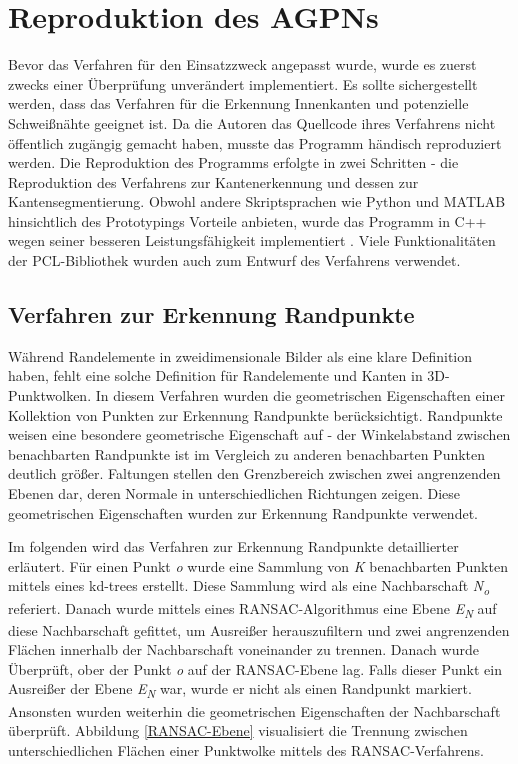 \section{Reproduktion des AGPNs}
Bevor das Verfahren für den Einsatzzweck angepasst wurde, wurde es zuerst zwecks einer Überprüfung unverändert implementiert. Es sollte sichergestellt werden, dass das Verfahren für die Erkennung Innenkanten und potenzielle Schweißnähte geeignet ist. Da die Autoren das Quellcode ihres Verfahrens nicht öffentlich zugängig gemacht haben, musste das Programm händisch reproduziert werden. Die Reproduktion des Programms erfolgte in zwei Schritten - die Reproduktion des Verfahrens zur Kantenerkennung und dessen zur Kantensegmentierung. Obwohl andere Skriptsprachen wie Python und MATLAB hinsichtlich des Prototypings Vorteile anbieten, wurde das Programm in C++ wegen seiner besseren Leistungsfähigkeit implementiert \autocite{svensson_performance_2021}. Viele Funktionalitäten der PCL-Bibliothek \autocite{rusu_3d_2011} wurden auch zum Entwurf des Verfahrens verwendet.

\subsection{Verfahren zur Erkennung Randpunkte}
Während Randelemente in zweidimensionale Bilder als eine klare Definition haben, fehlt eine solche Definition für Randelemente und Kanten in 3D-Punktwolken. In diesem Verfahren wurden die geometrischen Eigenschaften einer Kollektion von Punkten zur Erkennung Randpunkte berücksichtigt. Randpunkte weisen eine besondere geometrische Eigenschaft auf - der Winkelabstand zwischen benachbarten Randpunkte ist im Vergleich zu anderen benachbarten Punkten deutlich größer. Faltungen stellen den Grenzbereich zwischen zwei angrenzenden Ebenen dar, deren Normale in unterschiedlichen Richtungen zeigen. Diese geometrischen Eigenschaften wurden zur Erkennung Randpunkte verwendet. \autocite[1-2]{ni_edge_2016}

Im folgenden wird das Verfahren zur Erkennung Randpunkte detaillierter erläutert. Für einen Punkt \textit{o} wurde eine Sammlung von \textit{K} benachbarten Punkten mittels eines kd-trees erstellt. Diese Sammlung wird als eine Nachbarschaft \textit{N\textsubscript{o}} referiert. Danach wurde mittels eines RANSAC-Algorithmus eine Ebene \textit{E\textsubscript{N}} auf diese Nachbarschaft gefittet, um Ausreißer herauszufiltern und zwei angrenzenden Flächen innerhalb der Nachbarschaft voneinander zu trennen. Danach wurde Überprüft, ober der Punkt \textit{o} auf der RANSAC-Ebene lag. Falls dieser Punkt ein Ausreißer der Ebene \textit{E\textsubscript{N}} war, wurde er nicht als einen Randpunkt markiert. Ansonsten wurden weiterhin die geometrischen Eigenschaften der Nachbarschaft überprüft. Abbildung \ref{RANSAC-Ebene} visualisiert die Trennung zwischen unterschiedlichen Flächen einer Punktwolke mittels des RANSAC-Verfahrens. 

